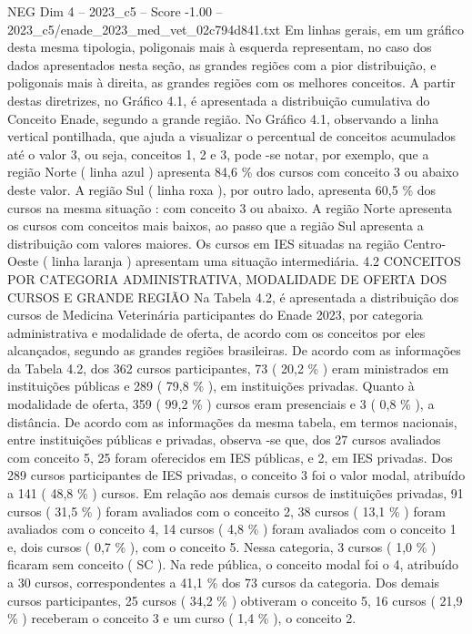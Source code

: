 \begin{textsample}{NEG Dim 4 – 2023\_c5 – Score -1.00 – 2023\_c5/enade\_2023\_med\_vet\_02c794d841.txt}
Em linhas gerais, em um gráfico desta mesma tipologia, poligonais mais à esquerda representam, no caso dos dados apresentados nesta seção, as grandes regiões com a pior distribuição, e poligonais mais à direita, as grandes regiões com os melhores conceitos.
A partir destas diretrizes, no Gráfico 4.1, é apresentada a distribuição cumulativa do Conceito Enade, segundo a grande região.
No Gráfico 4.1, observando a linha vertical pontilhada, que ajuda a visualizar o percentual de conceitos acumulados até o valor 3, ou seja, conceitos 1, 2 e 3, pode -se notar, por exemplo, que a região Norte ( linha azul ) apresenta 84,6 \% dos cursos com conceito 3 ou abaixo deste valor.
A região Sul ( linha roxa ), por outro lado, apresenta 60,5 \% dos cursos na mesma situação : com conceito 3 ou abaixo.
A região Norte apresenta os cursos com conceitos mais baixos, ao passo que a região Sul apresenta a distribuição com valores maiores.
Os cursos em IES situadas na região Centro-Oeste ( linha laranja ) apresentam uma situação intermediária. 4.2 CONCEITOS POR CATEGORIA ADMINISTRATIVA, MODALIDADE DE OFERTA DOS CURSOS E GRANDE REGIÃO Na Tabela 4.2, é apresentada a distribuição dos cursos de Medicina Veterinária participantes do Enade 2023, por categoria administrativa e modalidade de oferta, de acordo com os conceitos por eles alcançados, segundo as grandes regiões brasileiras.
De acordo com as informações da Tabela 4.2, dos 362 cursos participantes, 73 ( 20,2 \% ) eram ministrados em instituições públicas e 289 ( 79,8 \% ), em instituições privadas.
Quanto à modalidade de oferta, 359 ( 99,2 \% ) cursos eram presenciais e 3 ( 0,8 \% ), a distância.
De acordo com as informações da mesma tabela, em termos nacionais, entre instituições públicas e privadas, observa -se que, dos 27 cursos avaliados com conceito 5, 25 foram oferecidos em IES públicas, e 2, em IES privadas.
Dos 289 cursos participantes de IES privadas, o conceito 3 foi o valor modal, atribuído a 141 ( 48,8 \% ) cursos.
Em relação aos demais cursos de instituições privadas, 91 cursos ( 31,5 \% ) foram avaliados com o conceito 2, 38 cursos ( 13,1 \% ) foram avaliados com o conceito 4, 14 cursos ( 4,8 \% ) foram avaliados com o conceito 1 e, dois cursos ( 0,7 \% ), com o conceito 5.
Nessa categoria, 3 cursos ( 1,0 \% ) ficaram sem conceito ( SC ).
Na rede pública, o conceito modal foi o 4, atribuído a 30 cursos, correspondentes a 41,1 \% dos 73 cursos da categoria.
Dos demais cursos participantes, 25 cursos ( 34,2 \% ) obtiveram o conceito 5, 16 cursos ( 21,9 \% ) receberam o conceito 3 e um curso ( 1,4 \% ), o conceito 2.

\end{textsample}
